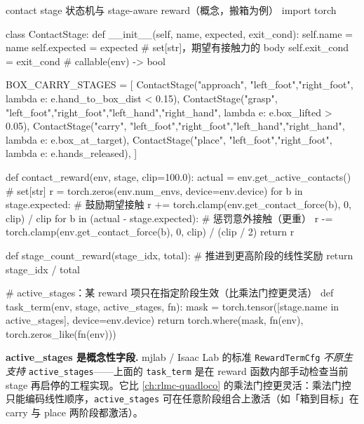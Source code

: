 \begin{codebox}[Python]{contact stage 状态机与 stage-aware reward（概念，搬箱为例）}
import torch

class ContactStage:
    def __init__(self, name, expected, exit_cond):
        self.name = name
        self.expected = expected          # set[str]，期望有接触力的 body
        self.exit_cond = exit_cond        # callable(env) -> bool

BOX_CARRY_STAGES = [
    ContactStage("approach",  {"left_foot","right_foot"},
                 lambda e: e.hand_to_box_dist < 0.15),
    ContactStage("grasp",     {"left_foot","right_foot","left_hand","right_hand"},
                 lambda e: e.box_lifted > 0.05),
    ContactStage("carry",     {"left_foot","right_foot","left_hand","right_hand"},
                 lambda e: e.box_at_target),
    ContactStage("place",     {"left_foot","right_foot"},
                 lambda e: e.hands_released),
]

def contact_reward(env, stage, clip=100.0):
    actual = env.get_active_contacts()            # set[str]
    r = torch.zeros(env.num_envs, device=env.device)
    for b in stage.expected:                       # 鼓励期望接触
        r += torch.clamp(env.get_contact_force(b), 0, clip) / clip
    for b in (actual - stage.expected):            # 惩罚意外接触（更重）
        r -= torch.clamp(env.get_contact_force(b), 0, clip) / (clip / 2)
    return r

def stage_count_reward(stage_idx, total):          # 推进到更高阶段的线性奖励
    return stage_idx / total

# active_stages：某 reward 项只在指定阶段生效（比乘法门控更灵活）
def task_term(env, stage, active_stages, fn):
    mask = torch.tensor([stage.name in active_stages], device=env.device)
    return torch.where(mask, fn(env), torch.zeros_like(fn(env)))
\end{codebox}

\begin{note}
\textbf{active\_stages 是概念性字段.}\;
mjlab / Isaac Lab 的标准 \texttt{RewardTermCfg} \emph{不原生支持} \verb|active_stages|——上面的 \verb|task_term| 是在 reward 函数内部手动检查当前 stage 再启停的工程实现。它比 \cref{ch:rlmc-quadloco} 的乘法门控更灵活：乘法门控只能编码线性顺序，\verb|active_stages| 可在任意阶段组合上激活（如「箱到目标」在 carry 与 place 两阶段都激活）。
\end{note}

